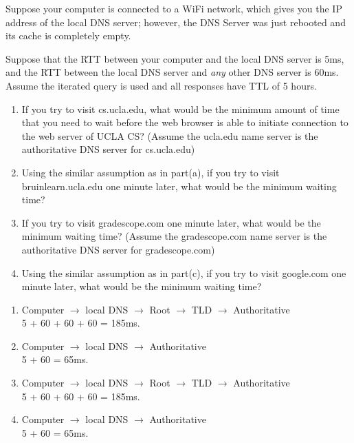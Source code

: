 \documentclass{report}
\begin{document}
\newpage

\begin{problem}


Suppose your computer is connected to a WiFi network, which gives you the IP address of the local DNS server; however, the DNS Server was just rebooted and its cache is completely empty.

Suppose that the RTT between your computer and the local DNS server is 5ms, and the RTT between the local DNS server and \textit{any} other DNS server is 60ms.
Assume the iterated query is used and all responses have TTL of 5 hours.

\begin{enumerate}
    \item If you try to visit cs.ucla.edu, what would be the minimum amount of time that you need to wait before the web browser is able to initiate connection to the web server of UCLA CS? (Assume the ucla.edu name server is the authoritative DNS server for cs.ucla.edu)
    \item Using the similar assumption as in part(a), if you try to visit bruinlearn.ucla.edu one minute later, what would be the minimum waiting time?
    \item If you try to visit gradescope.com one minute later, what would be the minimum waiting time? (Assume the gradescope.com name server is the authoritative DNS server for gradescope.com)
    \item Using the similar assumption as in part(c), if you try to visit google.com one minute later, what would be the minimum waiting time? 
\end{enumerate}


\begin{answer}{40em}
  \begin{enumerate}[label=(\alph*)]
  \item Computer $\to$ local DNS $\to$ Root $\to$ TLD $\to$ Authoritative \\
    5 + 60 + 60 + 60 = 185ms.
  \item Computer $\to$ local DNS $\to$ Authoritative \\
    5 + 60 = 65ms.
  \item Computer $\to$ local DNS $\to$ Root $\to$ TLD $\to$ Authoritative \\
    5 + 60 + 60 + 60 = 185ms.
  \item Computer $\to$ local DNS $\to$ Authoritative \\
    5 + 60 = 65ms.
  \end{enumerate}



\end{answer}
\end{problem}
\end{document}
